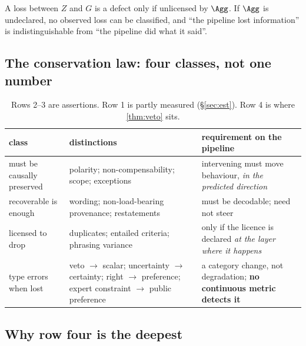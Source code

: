 \begin{proposition}
A loss between $Z$ and $G$ is a defect only if unlicensed by $\Agg$. If $\Agg$ is
undeclared, no observed loss can be classified, and ``the pipeline lost
information'' is indistinguishable from ``the pipeline did what it said''.
\end{proposition}


\subsection{The conservation law: four classes, not one number}


\begin{table}[H]\centering\footnotesize
\begin{tabularx}{\textwidth}{P{3.0cm}P{4.6cm}Y}
\toprule
class & distinctions & requirement on the pipeline\\
\midrule
must be causally preserved & polarity; non-compensability; scope; exceptions &
intervening must move behaviour, \emph{in the predicted direction}\\
recoverable is enough & wording; non-load-bearing provenance; restatements &
must be decodable; need not steer\\
licensed to drop & duplicates; entailed criteria; phrasing variance & only if the
licence is declared \emph{at the layer where it happens}\\
type errors when lost & veto $\to$ scalar; uncertainty $\to$ certainty; right
$\to$ preference; expert constraint $\to$ public preference & a category change,
not degradation; \textbf{no continuous metric detects it}\\
\bottomrule
\end{tabularx}
\caption{Rows 2--3 are assertions. Row 1 is partly measured (§\ref{sec:est}).
Row 4 is where \cref{thm:veto} sits.}
\label{tab:conservation}
\end{table}

\subsection{Why row four is the deepest}

